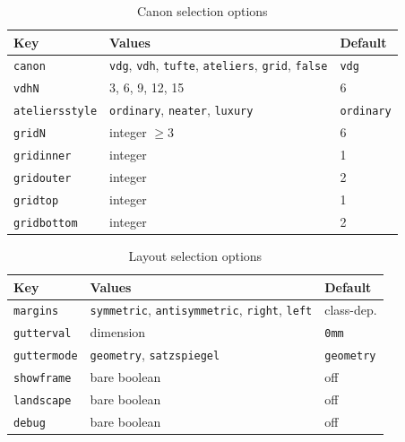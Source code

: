 \documentclass[11pt, twoside, openany]{book}
\begin{document}
\begin{table}[h]
	\caption{Canon selection options}
	\label{tab:cononselection}
	\centering
	\begin{tabular}{lll}
		\textbf{Key}        & \textbf{Values}  & \textbf{Default} \\
		\hline
		\texttt{canon}         & \texttt{vdg}, \texttt{vdh}, \texttt{tufte},
		\texttt{ateliers}, \texttt{grid}, \texttt{false}
		& \texttt{vdg} \\
		\texttt{vdhN}       & 3, 6, 9, 12, 15  & 6                \\
		\texttt{ateliersstyle} & \texttt{ordinary}, \texttt{neater}, \texttt{luxury}
		& \texttt{ordinary} \\
		\texttt{gridN}      & integer $\geq 3$ & 6                \\
		\texttt{gridinner}  & integer          & 1                \\
		\texttt{gridouter}  & integer          & 2                \\
		\texttt{gridtop}    & integer          & 1                \\
		\texttt{gridbottom} & integer          & 2                \\
	\end{tabular}
\end{table}





\begin{table}[h]
	\caption{Layout selection options}
	\label{tab:layoutselection}
	\centering
	\begin{tabular}{lll}
		\textbf{Key}       & \textbf{Values} & \textbf{Default} \\
		\hline
		\texttt{margins}       & \texttt{symmetric}, \texttt{antisymmetric},
		\texttt{right}, \texttt{left} & class-dep. \\
		\texttt{gutterval} & dimension       & \texttt{0mm}     \\
		\texttt{guttermode}    & \texttt{geometry}, \texttt{satzspiegel}
		& \texttt{geometry} \\
		\texttt{showframe} & bare boolean    & off              \\
		\texttt{landscape} & bare boolean    & off              \\
		\texttt{debug}     & bare boolean    & off              \\
	\end{tabular}
\end{table}
\end{document}
